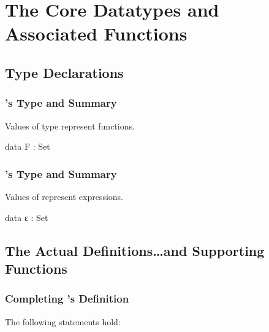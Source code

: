 \documentclass{report}
\begin{document}
\chapter{The Core Datatypes and Associated Functions}

\section{Type Declarations}

\subsection{'s Type and Summary}
Values of type  represent functions.

\begin{code}
data F : Set
\end{code}

\subsection{'s Type and Summary}
Values of  represent expressions.

\begin{code}
data ε : Set
\end{code}

\section{The Actual Definitions\ldots and Supporting Functions}

\subsection{Completing 's Definition}
The following statements hold:
\end{document}
